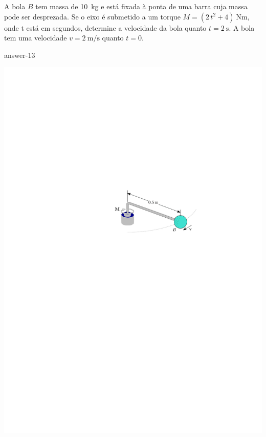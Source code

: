 \item A bola $B$ tem massa de \SI{10}{\kilogram} e está fixada à ponta de uma barra cuja massa pode ser desprezada. Se
o eixo é submetido a um torque $M=(2\,t^{2} + 4)\SI{}{\newton\meter}$, onde t está em segundos, determine a velocidade
da bola quanto $t=\SI{2}{\second}$. A bola tem uma velocidade $v=\SI{2}{\meter/\second}$ quanto $t=0$.

{answer-13}

\vspace{-1.7cm}
\begin{flushright}
	\includegraphics[scale=1.3]{images/draw_9}
\end{flushright}